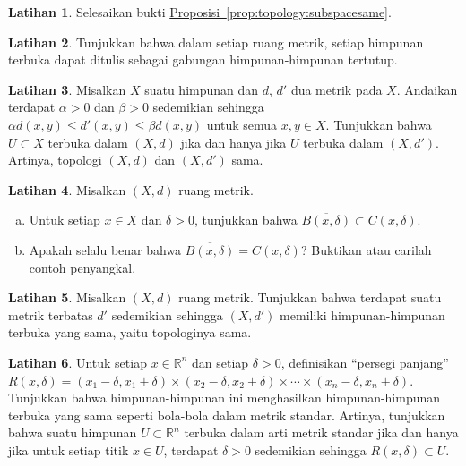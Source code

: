 \documentclass[12pt,openany]{book}
\newcommand{\R}{{\mathbb{R}}}
\newcommand{\myquote}[1]{``#1''}
\theoremstyle{plain}
\theoremstyle{remark}
\theoremstyle{definition}
\newenvironment{exbox}{%
    \def\FrameCommand{\vrule width 1pt \relax\hspace{10pt}}%
    \MakeFramed{\advance\hsize-\width\FrameRestore}%
}{%
    \endMakeFramed
}
\newenvironment{exparts}{%
    \leavevmode\begin{enumerate}[a),noitemsep,topsep=0pt,parsep=0pt,partopsep=0pt]
}{%
    \end{enumerate}
}
\theoremstyle{exercise}
\newtheorem{exercise}{Latihan}[section]
\theoremstyle{example}
\newcommand{\propref}[1]{\hyperref[#1]{Proposisi~\ref*{#1}}}
\begin{document}
\begin{exbox}
\begin{exercise}
Selesaikan bukti \propref{prop:topology:subspacesame}.
\end{exercise}

\begin{exercise}
Tunjukkan bahwa dalam setiap ruang metrik,
setiap himpunan terbuka dapat ditulis sebagai gabungan himpunan-himpunan tertutup.
\end{exercise}

\begin{exercise}
Misalkan $X$ suatu himpunan dan $d$, $d'$ dua metrik pada $X$.
Andaikan terdapat $\alpha > 0$ dan $\beta > 0$
sedemikian sehingga $\alpha d(x,y) \leq d'(x,y) \leq \beta d(x,y)$ untuk semua $x,y \in X$.
Tunjukkan bahwa $U \subset X$ terbuka dalam $(X,d)$ jika dan hanya jika $U$ terbuka dalam $(X,d')$.
Artinya, topologi $(X,d)$ dan $(X,d')$ sama.
\end{exercise}

\begin{exercise}
Misalkan $(X,d)$ ruang metrik.
\begin{exparts}
\item
Untuk setiap $x \in X$ dan $\delta > 0$, tunjukkan bahwa
$\overline{B(x,\delta)} \subset C(x,\delta)$.
\item
Apakah selalu benar bahwa
$\overline{B(x,\delta)} = C(x,\delta)$? Buktikan atau carilah contoh penyangkal.
\end{exparts}
\end{exercise}

\begin{exercise}
Misalkan $(X,d)$ ruang metrik. Tunjukkan bahwa terdapat suatu metrik terbatas
$d'$ sedemikian sehingga $(X,d')$ memiliki himpunan-himpunan terbuka yang sama, yaitu topologinya
sama.
\end{exercise}

\begin{exercise}
Untuk setiap $x \in \R^n$ dan setiap $\delta > 0$, definisikan \myquote{persegi panjang}
$R(x,\delta) =
(x_1-\delta,x_1+\delta) \times
(x_2-\delta,x_2+\delta) \times \cdots \times
(x_n-\delta,x_n+\delta)$. Tunjukkan bahwa himpunan-himpunan ini menghasilkan himpunan-himpunan
terbuka yang sama seperti bola-bola dalam metrik standar. Artinya, tunjukkan bahwa suatu himpunan $U \subset \R^n$
terbuka dalam arti metrik standar jika dan hanya jika untuk setiap
titik $x \in U$, terdapat $\delta > 0$ sedemikian sehingga $R(x,\delta) \subset
U$.
\end{exercise}
\end{exbox}
\end{document}
